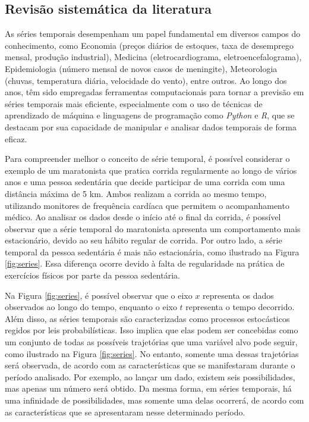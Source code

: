 \subsection{Revis\~ao sistem\'atica da literatura} \label{subsec:revisão}

As séries temporais desempenham um papel fundamental em diversos campos do conhecimento, como Economia (preços diários de estoques, taxa de desemprego mensal, produção industrial), Medicina (eletrocardiograma, eletroencefalograma), Epidemiologia (número mensal de novos casos de meningite), Meteorologia (chuvas, temperatura diária, velocidade do vento), entre outros. Ao longo dos anos, têm sido empregadas ferramentas computacionais para tornar a previsão em séries temporais mais eficiente, especialmente com o uso de técnicas de aprendizado de máquina e linguagens de programação como \textit{Python} e \textit{R}, que se destacam por sua capacidade de manipular e analisar dados temporais de forma eficaz.

Para compreender melhor o conceito de série temporal, é possível considerar o exemplo de um maratonista que pratica corrida regularmente ao longo de vários anos e uma pessoa sedentária que decide participar de uma corrida com uma distância máxima de 5 km. Ambos realizam a corrida ao mesmo tempo, utilizando monitores de frequência cardíaca que permitem o acompanhamento médico. Ao analisar os dados desde o início até o final da corrida, é possível observar que a série temporal do maratonista apresenta um comportamento mais estacionário, devido ao seu hábito regular de corrida. Por outro lado, a série temporal da pessoa sedentária é mais não estacionária, como ilustrado na Figura \ref{fig:series}. Essa diferença ocorre devido à falta de regularidade na prática de exercícios físicos por parte da pessoa sedentária.



Na Figura \ref{fig:series}, é possível observar que o eixo $x$ representa os dados observados ao longo do tempo, enquanto o eixo $t$ representa o tempo decorrido. Além disso, as séries temporais são caracterizadas como processos estocásticos regidos por leis probabilísticas. Isso implica que elas podem ser concebidas como um conjunto de todas as possíveis trajetórias que uma variável alvo pode seguir, como ilustrado na Figura \ref{fig:series}. No entanto, somente uma dessas trajetórias será observada, de acordo com as características que se manifestaram durante o período analisado. Por exemplo, ao lançar um dado, existem seis possibilidades, mas apenas um número será obtido. Da mesma forma, em séries temporais, há uma infinidade de possibilidades, mas somente uma delas ocorrerá, de acordo com as características que se apresentaram nesse determinado período.

